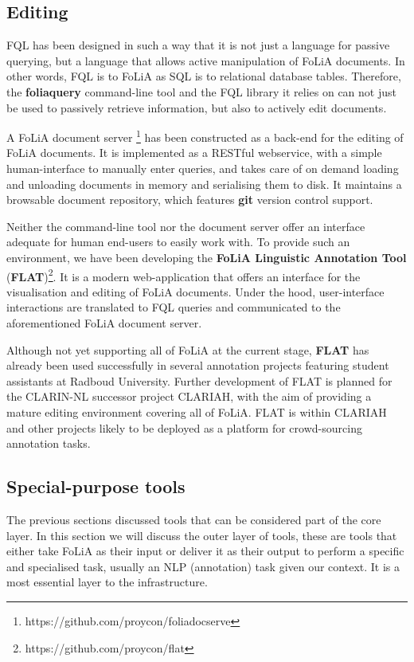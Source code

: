 \documentclass[a4paper,11pt]{article}
\begin{document}
\subsection{Editing}

FQL has been designed in such a way that it is not just a language for passive
querying, but a language that allows active manipulation of FoLiA documents. In
other words, FQL is to FoLiA as SQL is to relational database tables.
Therefore, the \textbf{foliaquery} command-line tool and the FQL library it relies on
can not just be used to passively retrieve information, but also to actively
edit documents.

A FoLiA document server \footnote{https://github.com/proycon/foliadocserve} has
been constructed as a back-end for the editing of FoLiA documents. It is
implemented as a RESTful webservice, with a simple human-interface to manually
enter queries, and takes care of on demand loading and unloading documents in
memory and serialising them to disk. It maintains a browsable document
repository, which features \textbf{git} version control support.

Neither the command-line tool nor the document server offer an
interface adequate for human end-users to easily work with. To provide
such an environment, we have been developing the \textbf{FoLiA Linguistic Annotation Tool}
(\textbf{FLAT})\footnote{https://github.com/proycon/flat}. It is a modern
web-application that offers an interface for the visualisation and editing of
FoLiA documents. Under the hood, user-interface interactions are translated to FQL
queries and communicated to the aforementioned FoLiA document server.

Although not yet supporting all of FoLiA at the current stage, \textbf{FLAT} has already
been used successfully in several annotation projects featuring student
assistants at Radboud University. Further development of FLAT is
planned for the CLARIN-NL successor project CLARIAH, with the aim of providing
a mature editing environment covering all of FoLiA. FLAT is within CLARIAH and other projects likely to be deployed as a platform for crowd-sourcing annotation tasks.

\subsection{Special-purpose tools}

The previous sections discussed tools that can be considered part of the
core layer. In this section we will discuss the outer layer of tools, these are
tools that either take FoLiA as their input or deliver it as their output to
perform a specific and specialised task, usually an NLP (annotation) task given our context.
It is a most essential layer to the infrastructure.
\end{document}

